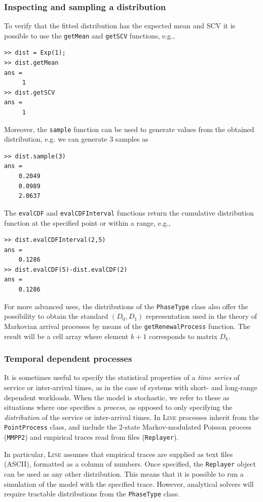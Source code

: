 \subsubsection{Inspecting and sampling a distribution}
To verify that the fitted distribution has the expected mean and SCV it is possible to use the \texttt{getMean} and \texttt{getSCV} functions, e.g.,
\begin{lstlisting}
>> dist = Exp(1);
>> dist.getMean
ans =
     1
>> dist.getSCV
ans =
     1
\end{lstlisting}
Moreover, the \texttt{sample} function can be used to generate values from the obtained distribution, e.g. we can generate 3 samples as
\begin{lstlisting}
>> dist.sample(3)
ans =
    0.2049
    0.0989
    2.0637
\end{lstlisting}
The \texttt{evalCDF} and \texttt{evalCDFInterval} functions return the cumulative distribution function at the specified point or within a range, e.g.,
\begin{lstlisting}
>> dist.evalCDFInterval(2,5)
ans =
    0.1286
>> dist.evalCDF(5)-dist.evalCDF(2)
ans =
    0.1286
\end{lstlisting}
For more advanced uses, the distributions of the \texttt{PhaseType} class also offer the possibility to obtain the standard $(D_0,D_1)$ representation used in the theory of Markovian arrival processes by means of the \texttt{getRenewalProcess} function. The result will be a cell array where element $k+1$ corresponds to matrix $D_k$.

\subsubsection{Temporal dependent processes}
It is sometimes useful to specify the statistical properties of a {\em time series} of service or inter-arrival times, as in the case of systems with short- and long-range dependent workloads. When the model is stochastic, we refer to these as situations where one specifies a {\em process}, as opposed to only specifying the {\em distribution} of the service or inter-arrival times. In \textsc{Line} processes inherit from the \texttt{PointProcess} class, and include the 2-state Markov-modulated Poisson process (\texttt{MMPP2}) and empirical traces read from files (\texttt{Replayer}).

In particular, \textsc{Line} assumes that empirical traces are supplied as text files (ASCII), formatted as a column of numbers. Once specified, the \texttt{Replayer} object can be used as any other distribution. This means that it is possible to run a simulation of the model with the specified trace. However, analytical solvers will require tractable distributions from the \texttt{PhaseType} class.

